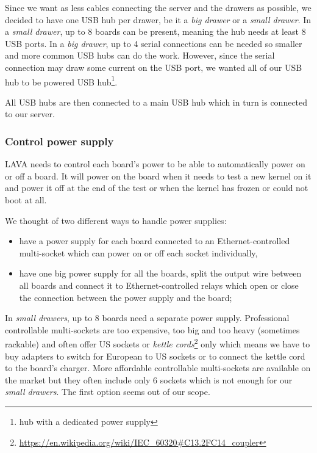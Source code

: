 Since we want as less cables connecting the server and the drawers as possible, we decided to have one USB hub per drawer, be it a \textit{big drawer} or a \textit{small drawer}. In a \textit{small drawer}, up to 8 boards can be present, meaning the hub needs at least 8 USB ports. In a \textit{big drawer}, up to 4 serial connections can be needed so smaller and more common USB hubs can do the work. However, since the serial connection may draw some current on the USB port, we wanted all of our USB hub to be powered USB hub\footnote{hub with a dedicated power supply}.

All USB hubs are then connected to a main USB hub which in turn is connected to our server.

\subsubsection{Control power supply}

LAVA needs to control each board's power to be able to automatically power on or off a board. It will power on the board when it needs to test a new kernel on it and power it off at the end of the test or when the kernel has frozen or could not boot at all.

We thought of two different ways to handle power supplies:
\begin{itemize}
  \item have a power supply for each board connected to an Ethernet-controlled multi-socket which can power on or off each socket individually,
  \item have one big power supply for all the boards, split the output wire between all boards and connect it to Ethernet-controlled relays which open or close the connection between the power supply and the board;
\end{itemize}

In \textit{small drawers}, up to 8 boards need a separate power supply. Professional controllable multi-sockets are too expensive, too big and too heavy (sometimes rackable) and often offer US sockets or \textit{kettle cords}\footnote{\url{https://en.wikipedia.org/wiki/IEC\_60320\#C13.2FC14\_coupler}} only which means we have to buy adapters to switch for European to US sockets or to connect the kettle cord to the board's charger. More affordable controllable multi-sockets are available on the market but they often include only 6 sockets which is not enough for our \textit{small drawers}. The first option seems out of our scope.

